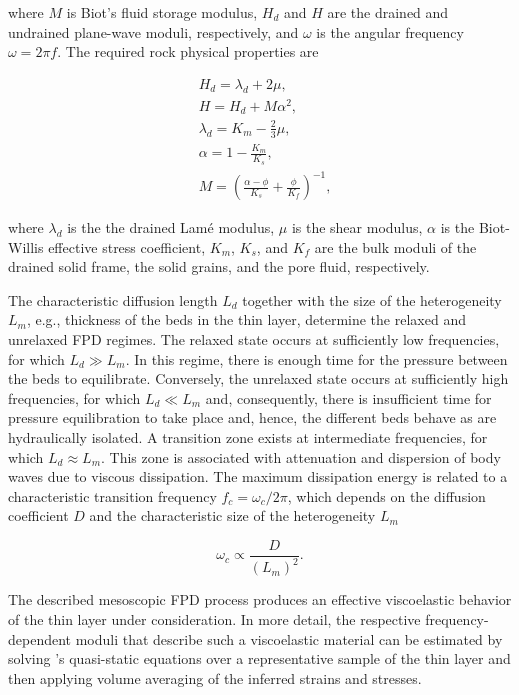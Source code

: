 \documentclass[draft]{agujournal2019}
\begin{document}
where $M$ is Biot’s fluid storage modulus, $H_d$ and $H$ are the drained and undrained plane-wave moduli, respectively, and $\omega$ is the angular frequency $\omega = 2 \pi f$.
The required rock physical properties are
\begin{linenomath*}
\begin{equation}\label{Eq.4}
\begin{split}
& H_d = \lambda_d + 2 \mu, \\
& H = H_d + M \alpha ^2, \\
& \lambda_d= K_m - \frac{2}{3} \mu, \\
& \alpha =1-\frac{K_m}{K_s},\\
& M  =\left( \frac{\alpha-\phi}{K_s} +\frac{\phi}{K_f} \right)^{-1},
\end{split}
\end{equation}
\end{linenomath*}
where $\lambda_d$ is the the drained Lamé modulus, $\mu$ is the shear modulus, $\alpha$ is the Biot-Willis effective stress coefficient, $K_m$, $K_s$, and $K_f$ are the bulk moduli of the drained solid frame, the solid grains, and the pore fluid, respectively.

The characteristic diffusion length $L_d$ together with the size of the heterogeneity $L_m$, e.g., thickness of the beds in the thin layer, determine the relaxed and unrelaxed FPD regimes. The relaxed state occurs at sufficiently low frequencies, for which  $L_d \gg L_m$. In this regime, there is enough time for the pressure between the beds to equilibrate. Conversely, the unrelaxed state occurs at sufficiently high frequencies, for which $L_d \ll L_m$ and, consequently, there is insufficient time for pressure equilibration to take place and, hence, the different beds behave as are hydraulically isolated. A transition zone exists at intermediate frequencies, for which $L_d \approx L_m$.
This zone is associated with attenuation and dispersion of body waves due to viscous dissipation. The maximum dissipation energy is related to a characteristic transition frequency $f_c= \omega_c/2\pi$, which depends on the diffusion coefficient $D$ and the characteristic size of the heterogeneity $L_m$ \cite{Muller2006}
\begin{linenomath*}
\begin{equation}\label{Eq.5}
\omega_c \propto \frac{D}{(L_m)^2}.
\end{equation}
\end{linenomath*}

The described mesoscopic FPD process produces an effective viscoelastic behavior of the thin layer under consideration. In more detail, the respective frequency-dependent  moduli that describe such a viscoelastic material can be estimated by solving \citeauthor{Biot1941}'s \citeyear{Biot1941} quasi-static equations over a representative sample of the thin layer and then applying volume averaging of the inferred strains and stresses.
\end{document}
